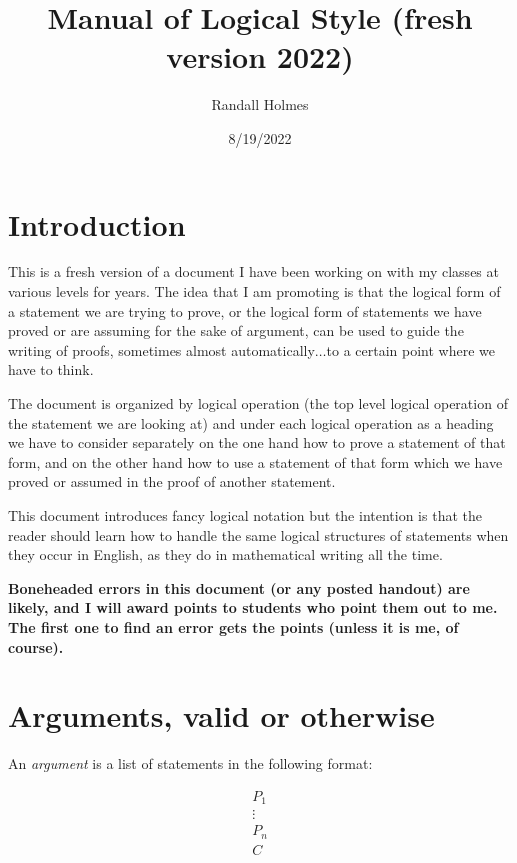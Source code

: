 \documentclass[12pt]{article}
\title{Manual of Logical Style (fresh version 2022)}
\author{Randall Holmes}
\date{8/19/2022}
\begin{document}
\maketitle
\tableofcontents


\section{Introduction}

This is a fresh version of a document I have been working on with my classes at various levels for years.  The idea that I am promoting is that the logical form of a statement we are trying to prove, or the logical form of statements we have proved or are assuming for the sake of argument, can be used to guide the writing of proofs, sometimes almost automatically$\ldots$to a certain point where we have to think.

The document is organized by logical operation (the top level logical operation of the statement we are looking at) and under each logical operation as a heading we have to consider separately on the one hand how to prove a statement of that form, and on the other hand how to use a statement of that form which we have proved or assumed in the proof of another statement.

This document introduces fancy logical notation but the intention is that the reader should learn how to handle the same logical structures of statements when they occur in English, as they do in mathematical writing all the time.

{\bf Boneheaded errors in this document (or any posted handout) are likely, and I will award points to students who point them out to me.  The first one to find an error gets the points (unless it is me, of course).}

\section{Arguments, valid or otherwise}

An {\em argument} is a list of statements in the following format:

$$\begin{array}  {c}

P_1 \\

\vdots \\

P_n \\ \hline

C \end{array}$$
\end{document}
